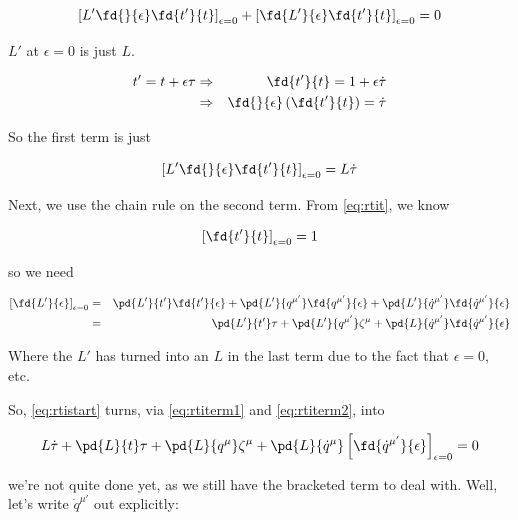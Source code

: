 \documentclass[12pt]{article}
\numberwithin{equation}{section}
\begin{document}
\begin{equation}
  \label{eq:rtistart}
  \left[ L'\fd{}{\epsilon}\fd{t'}{t}  \right]_{\epsilon=0} + \left[ \fd{L'}{\epsilon}\fd{t'}{t}  \right]_{\epsilon=0} = 0
\end{equation}

$L'$ at $\epsilon=0$ is just $L$. 

\begin{eqnarray}
  \label{eq:rtit}
  t'=t+\epsilon\tau &\Rightarrow& \fd{t'}{t} = 1+\epsilon\dot{\tau} \\
  &\Rightarrow& \fd{}{\epsilon}\left(\fd{t'}{t}\right) = \dot{\tau} \notag
\end{eqnarray}

So the first term is just

\begin{equation}
  \label{eq:rtiterm1}
  \left[ L'\fd{}{\epsilon}\fd{t'}{t}  \right]_{\epsilon=0} = L\dot{\tau}
\end{equation}

Next, we use the chain rule on the second term. From \ref{eq:rtit}, we know


\begin{equation}
\left[ \fd{t'}{t} \right]_{\epsilon=0} = 1
\end{equation}

so we need

\begin{eqnarray}
  \left[ \fd{L'}{\epsilon} \right]_{\epsilon=0} &=& \pd{L'}{t'}\fd{t'}{\epsilon} + \pd{L'}{q^{\mu{'}}}\fd{q^{\mu{'}}}{\epsilon} +  \pd{L'}{\dot{q}^{\mu{'}}}\fd{\dot{q}^{\mu{'}}}{\epsilon} \notag\\
  \label{eq:rtiterm2}
 &=&\pd{L'}{t'}\tau + \pd{L'}{q^{\mu{'}}}\zeta^\mu +  \pd{L}{\dot{q}^{\mu{'}}}\fd{\dot{q}^{\mu{'}}}{\epsilon}
\end{eqnarray}

Where the $L'$ has turned into an $L$ in the last term due to the fact that $\epsilon=0$, etc.

So, \ref{eq:rtistart} turns, via \ref{eq:rtiterm1} and \ref{eq:rtiterm2}, into 

\begin{equation}
  \label{eq:rtialmostdone}
  L\dot{\tau} + \pd{L}{t}\tau + \pd{L}{q^{\mu}}\zeta^\mu +  \pd{L}{\dot{q}^{\mu}} \left[ \fd{\dot{q}^{\mu{'}}}{\epsilon} \right]_{\epsilon=0} = 0
\end{equation}

we're not quite done yet, as we still have the bracketed term to deal with. Well, let's write $\dot{q}^{\mu{'}}$ out explicitly:
\end{document}
